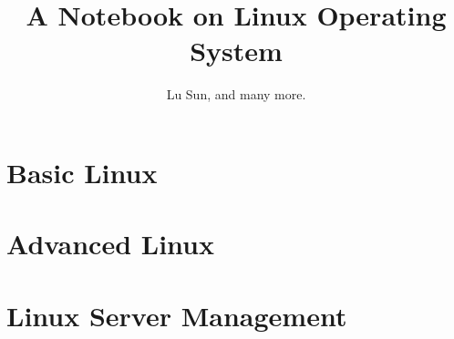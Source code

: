 



\makeindex



\frontmatter

\title{A Notebook on Linux Operating System}
\author{Lu Sun, and many more.}

\maketitle


\tableofcontents


\listoffigures
\listoftables

\mainmatter

\part{Basic Linux}















\part{Advanced Linux}









\part{Linux Server Management}

